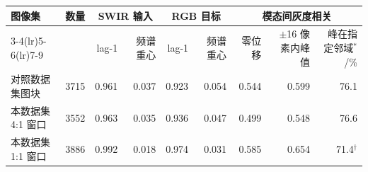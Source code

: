 \begin{tabular}{@{}lrrrrrrrr@{}}
\toprule
图像集 & 数量 & \multicolumn{2}{c}{SWIR 输入} & \multicolumn{2}{c}{RGB 目标} & \multicolumn{3}{c}{模态间灰度相关}\\
\cmidrule(lr){3-4}\cmidrule(lr){5-6}\cmidrule(lr){7-9}
 & & lag-1 & 频谱重心 & lag-1 & 频谱重心 & 零位移 & $\pm$16 像素内峰值 & 峰在指定邻域$^{*}$/\%\\
\midrule
对照数据集图块 & 3715 & 0.961 & 0.037 & 0.923 & 0.054 & 0.544 & 0.599 & 76.1 \\
本数据集 4:1 窗口 & 3552 & 0.963 & 0.035 & 0.936 & 0.047 & 0.499 & 0.548 & 76.6 \\
本数据集 1:1 窗口 & 3886 & 0.992 & 0.018 & 0.974 & 0.031 & 0.585 & 0.654 & 71.4$^{\dagger}$ \\
\bottomrule
\end{tabular}
